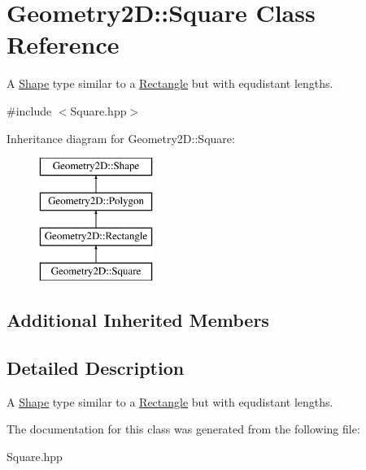\hypertarget{class_geometry2_d_1_1_square}{}\section{Geometry2D\+:\+:Square Class Reference}
\label{class_geometry2_d_1_1_square}


A \mbox{\hyperlink{class_geometry2_d_1_1_shape}{Shape}} type similar to a \mbox{\hyperlink{class_geometry2_d_1_1_rectangle}{Rectangle}} but with equdistant lengths.  




{\ttfamily \#include $<$Square.\+hpp$>$}

Inheritance diagram for Geometry2D\+:\+:Square\+:\begin{figure}[H]
\begin{center}
\leavevmode
\includegraphics[height=4.000000cm]{class_geometry2_d_1_1_square}
\end{center}
\end{figure}
\subsection*{Additional Inherited Members}


\subsection{Detailed Description}
A \mbox{\hyperlink{class_geometry2_d_1_1_shape}{Shape}} type similar to a \mbox{\hyperlink{class_geometry2_d_1_1_rectangle}{Rectangle}} but with equdistant lengths. 

The documentation for this class was generated from the following file\+:\begin{DoxyCompactItemize}
\item 
Square.\+hpp\end{DoxyCompactItemize}
